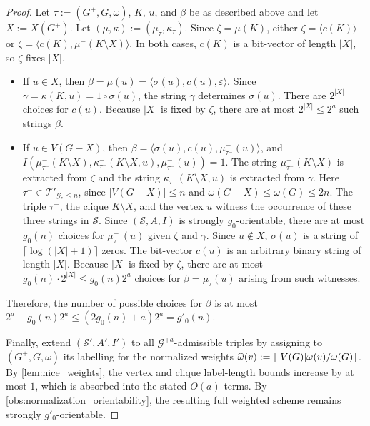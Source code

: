 \documentclass{patmorin}
\renewcommand{\le}{\leqslant}
\newcommand{\Oh}{O}
\DeclarePairedDelimiter{\ceil}{\lceil}{\rceil}
\newcommand{\calG}{\mathcal{G}}
\newcommand{\calS}{\mathcal{S}}
\newcommand{\calT}{\mathcal{T}}
\begin{document}
\begin{proof}
  Let $\tau:=(G^+,G,\omega)$, $K$, $u$, and $\beta$ be as described above and let $X:=X(G^+)$.  Let $(\mu,\kappa):=(\mu_\tau,\kappa_\tau)$. Since $\zeta = \mu(K)$, either $\zeta = \langle c(K) \rangle$ or $\zeta = \langle c(K), \mu^-(K\setminus X)\rangle$. In both cases, $c(K)$ is a bit-vector of length $|X|$, so $\zeta$ fixes $|X|$.
  \begin{itemize}[nosep,nolistsep]
    \item If $u\in X$, then $\beta=\mu(u)=\langle\sigma(u),c(u),\varepsilon\rangle$. Since $\gamma = \kappa(K,u) = 1 \circ \sigma(u)$, the string $\gamma$ determines $\sigma(u)$. There are $2^{|X|}$ choices for $c(u)$. Because $|X|$ is fixed by $\zeta$, there are at most $2^{|X|} \le 2^a$ such strings $\beta$.
    \item If $u\in V(G-X)$, then $\beta=\langle \sigma(u),c(u),\mu_{\tau^-}^-(u)\rangle$, and $I(\mu_{\tau^-}^-(K\setminus X),\kappa_{\tau^-}^-(K\setminus X,u),\mu_{\tau^-}^-(u))=1$.  The string $\mu_{\tau^-}^-(K\setminus X)$ is extracted from $\zeta$ and the string $\kappa^-_{\tau^-}(K\setminus X,u)$ is extracted from $\gamma$. Here $\tau^-\in\calT'_{\calG,\le n}$, since $|V(G-X)|\le n$ and $\omega(G-X)\le\omega(G)\le 2n$. The triple $\tau^-$, the clique $K\setminus X$, and the vertex $u$ witness the occurrence of these three strings in $\calS$. Since $(\calS,A,I)$ is strongly $g_0$-orientable, there are at most $g_0(n)$ choices for $\mu_{\tau^-}^-(u)$ given $\zeta$ and $\gamma$.  Since $u\not\in X$, $\sigma(u)$ is a string of $\lceil\log(|X|+1)\rceil$ zeros.  The bit-vector $c(u)$ is an arbitrary binary string of length $|X|$. Because $|X|$ is fixed by $\zeta$, there are at most $g_0(n)\cdot 2^{|X|} \le g_0(n) 2^a$ choices for $\beta=\mu_\tau(u)$ arising from such witnesses.
  \end{itemize}
  Therefore, the number of possible choices for $\beta$ is at most $2^a+ g_0(n) 2^{a} \le (2g_0(n)+a)2^{a} = g'_0(n)$.

  Finally, extend $(\calS',A',I')$ to all $\calG^{+a}$-admissible triples by assigning to $(G^+,G,\omega)$ its labelling for the normalized weights $\widehat\omega(v):=\ceil{|V(G)|\omega(v)/\omega(G)}$. By \cref{lem:nice_weights}, the vertex and clique label-length bounds increase by at most $1$, which is absorbed into the stated $\Oh(a)$ terms. By \cref{obs:normalization_orientability}, the resulting full weighted scheme remains strongly $g'_0$-orientable. \qedhere
\end{proof}
\end{document}
